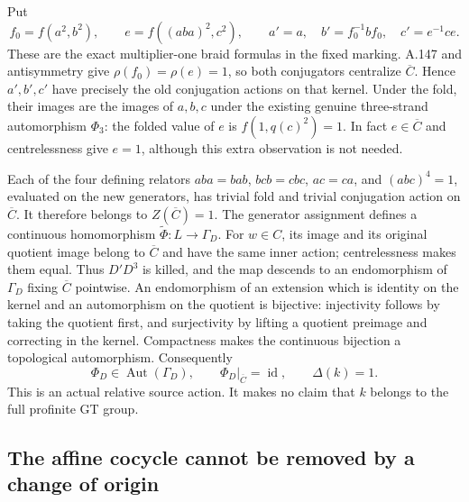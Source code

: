 Put
\[
 f_0=f(a^2,b^2),\qquad e=f((aba)^2,c^2),
 \qquad
 a'=a,\quad b'=f_0^{-1}bf_0,\quad c'=e^{-1}ce.
\]
These are the exact multiplier-one braid formulas in the
fixed marking.  A.147 and antisymmetry give
$\rho(f_0)=\rho(e)=1$, so both conjugators centralize
$\overline C$.  Hence $a',b',c'$ have precisely the old
conjugation actions on that kernel.  Under the fold, their
images are the images of $a,b,c$ under the existing genuine
three-strand automorphism $\Phi_3$: the folded value of $e$
is $f(1,q(c)^2)=1$.  In fact $e\in\overline C$ and
centrelessness give $e=1$, although this extra observation
is not needed.

Each of the four defining relators
$aba=bab$, $bcb=cbc$, $ac=ca$, and $(abc)^4=1$,
evaluated on the new generators, has trivial fold and
trivial conjugation action on $\overline C$.  It therefore
belongs to $Z(\overline C)=1$.  The generator assignment
defines a continuous homomorphism
$\widetilde\Phi:L\to\Gamma_D$.
For $w\in C$, its image and its original quotient image
belong to $\overline C$ and have the same inner action;
centrelessness makes them equal.  Thus $D'D^3$ is killed,
and the map descends to an endomorphism of $\Gamma_D$
fixing $\overline C$ pointwise.  An endomorphism of an
extension which is identity on the kernel and an
automorphism on the quotient is bijective: injectivity
follows by taking the quotient first, and surjectivity by
lifting a quotient preimage and correcting in the kernel.
Compactness makes the continuous bijection a topological
automorphism.  Consequently
\[
 \boxed{\quad \Phi_D\in\operatorname{Aut}(\Gamma_D),
   \qquad \Phi_D|_{\overline C}=\operatorname{id},
   \qquad\Delta(k)=1.\quad}
\]
This is an actual relative source action.  It makes no
claim that $k$ belongs to the full profinite GT group.

\subsection{The affine cocycle cannot be removed by a change of origin}


